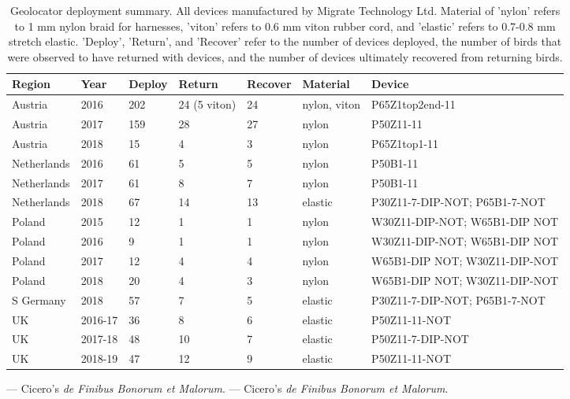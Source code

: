\documentclass[a4paper, twoside]{templates/ociamthesis}
\begin{document}
\begin{table}[t]

\caption{\label{tab:capture-recapture-table}Geolocator deployment summary. All devices manufactured by Migrate Technology Ltd. Material of 'nylon' refers to 1 mm nylon braid for harnesses, 'viton' refers to 0.6 mm viton rubber cord, and 'elastic' refers to 0.7-0.8 mm stretch elastic. 'Deploy', 'Return', and 'Recover' refer to the number of devices deployed, the number of birds that were observed to have returned with devices, and the number of devices ultimately recovered from returning birds.}
\centering
\fontsize{9.5}{11.5}\selectfont
\begin{tabular}{l|l|l|l|l|l|>{\raggedright\arraybackslash}p{9em}}
\hline
Region & Year & Deploy & Return & Recover & Material & Device\\
\hline
Austria & 2016 & 202 & 24 (5 viton) & 24 & nylon, viton & P65Z1top2end-11\\
\hline
Austria & 2017 & 159 & 28 & 27 & nylon & P50Z11-11\\
\hline
Austria & 2018 & 15 & 4 & 3 & nylon & P65Z1top1-11\\
\hline
Netherlands & 2016 & 61 & 5 & 5 & nylon & P50B1-11\\
\hline
Netherlands & 2017 & 61 & 8 & 7 & nylon & P50B1-11\\
\hline
Netherlands & 2018 & 67 & 14 & 13 & elastic & P30Z11-7-DIP-NOT; P65B1-7-NOT\\
\hline
Poland & 2015 & 12 & 1 & 1 & nylon & W30Z11-DIP-NOT; W65B1-DIP NOT\\
\hline
Poland & 2016 & 9 & 1 & 1 & nylon & W30Z11-DIP-NOT; W65B1-DIP NOT\\
\hline
Poland & 2017 & 12 & 4 & 4 & nylon & W65B1-DIP NOT; W30Z11-DIP-NOT\\
\hline
Poland & 2018 & 20 & 4 & 3 & nylon & W65B1-DIP NOT; W30Z11-DIP-NOT\\
\hline
S Germany & 2018 & 57 & 7 & 5 & elastic & P30Z11-7-DIP-NOT; P65B1-7-NOT\\
\hline
UK & 2016-17 & 36 & 8 & 6 & elastic & P50Z11-11-NOT\\
\hline
UK & 2017-18 & 48 & 10 & 7 & elastic & P50Z11-7-DIP-NOT\\
\hline
UK & 2018-19 & 47 & 12 & 9 & elastic & P50Z11-11-NOT\\
\hline
\end{tabular}
\end{table}

--- Cicero's \emph{de Finibus Bonorum et Malorum}. --- Cicero's \emph{de Finibus Bonorum et Malorum}.
\end{document}
